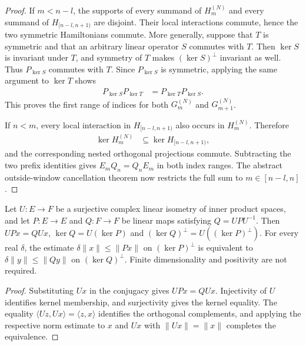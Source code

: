 \begin{proof}
    \leanok
    If $m<n-l$, the supports of every summand of $H_m^{(N)}$ and every
    summand of $H_{[n-l,n+1)}$ are disjoint.  Their local interactions commute,
    hence the two symmetric Hamiltonians commute.  More generally, suppose
    that $T$ is symmetric and that an arbitrary linear operator $S$ commutes
    with $T$.  Then $\ker S$ is invariant under $T$, and symmetry of $T$ makes
    $(\ker S)^\perp$ invariant as well.  Thus $P_{\ker S}$ commutes with $T$.
    Since $P_{\ker S}$ is symmetric, applying the same argument to $\ker T$
    shows
    \begin{align}
        P_{\ker S}P_{\ker T} & =P_{\ker T}P_{\ker S}.
    \end{align}
    This proves the first range of indices for both $G_m^{(N)}$ and
    $G_{m+1}^{(N)}$.

    If $n<m$, every local interaction in $H_{[n-l,n+1)}$ also occurs in
    $H_m^{(N)}$.  Therefore
    \begin{align}
        \ker H_m^{(N)} & \subseteq\ker H_{[n-l,n+1)},
    \end{align}
    and the corresponding nested orthogonal projections commute.  Subtracting
    the two prefix identities gives $E_mQ_n=Q_nE_m$ in both index ranges.  The
    abstract outside-window cancellation theorem now restricts the full sum to
    $m\in[n-l,n]$.
\end{proof}

\begin{lemma}
    \label{thm:martingale_isometric_conjugation_gap}
    \leanok
    Let $U:E\to F$ be a surjective complex linear isometry of inner
    product spaces, and let $P:E\to E$ and $Q:F\to F$ be linear maps
    satisfying $Q=UPU^{-1}$. Then $UPx=QUx$,
    $\ker Q=U(\ker P)$ and $(\ker Q)^\perp=U((\ker P)^\perp)$.
    For every real $\delta$, the estimate
    $\delta\|x\|\leq\|Px\|$ on $(\ker P)^\perp$ is equivalent to
    $\delta\|y\|\leq\|Qy\|$ on $(\ker Q)^\perp$.
    Finite dimensionality and positivity are not required.
\end{lemma}
\begin{proof}
    \leanok
    Substituting $Ux$ in the conjugacy gives $UPx=QUx$.
    Injectivity of $U$ identifies kernel membership, and surjectivity
    gives the kernel equality. The equality
    $\langle Uz,Ux\rangle=\langle z,x\rangle$ identifies the orthogonal
    complements, and applying the respective norm estimate to $x$ and
    $Ux$ with $\|Ux\|=\|x\|$ completes the equivalence.
\end{proof}

